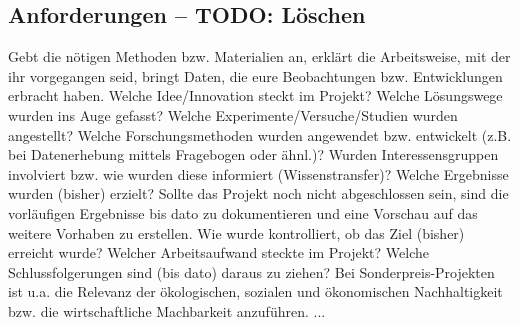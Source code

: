 \subsection{Anforderungen -- TODO: Löschen}
Gebt die nötigen Methoden bzw. Materialien an, erklärt die Arbeitsweise, mit der ihr
vorgegangen seid, bringt Daten, die eure Beobachtungen bzw. Entwicklungen erbracht
haben.
Welche Idee/Innovation steckt im Projekt?
Welche Lösungswege wurden ins Auge gefasst?
Welche Experimente/Versuche/Studien wurden angestellt?
Welche Forschungsmethoden wurden angewendet bzw. entwickelt (z.B. bei Datenerhebung mittels Fragebogen oder ähnl.)?
Wurden Interessensgruppen involviert bzw. wie wurden diese informiert (Wissenstransfer)?
Welche Ergebnisse wurden (bisher) erzielt?
Sollte das Projekt noch nicht abgeschlossen sein, sind die vorläufigen Ergebnisse bis dato zu dokumentieren und eine Vorschau auf das weitere Vorhaben zu erstellen.
Wie wurde kontrolliert, ob das Ziel (bisher) erreicht wurde?
Welcher Arbeitsaufwand steckte im Projekt?
Welche Schlussfolgerungen sind (bis dato) daraus zu ziehen?
Bei Sonderpreis-Projekten ist u.a. die Relevanz der ökologischen, sozialen und ökonomischen Nachhaltigkeit bzw. die wirtschaftliche Machbarkeit anzuführen. ...
